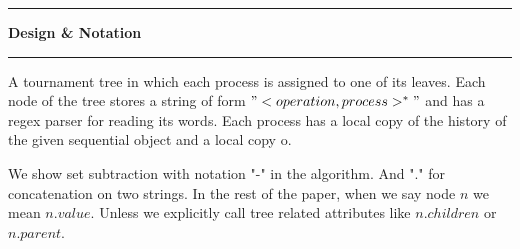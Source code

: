 \documentclass[10pt]{article}
\newcommand\question[1]{\vspace{1.2em}\hrule\textbf{ #1}\vspace{.5em}\hrule}
\theoremstyle{definition}
\begin{document}
%
%
%
%
%
\question{Design \& Notation}
A tournament tree in which each process is assigned to one of its leaves. Each node of the tree stores a string of form $"<operation, process>^*"$ and has a regex parser for reading its words. Each process has a local copy of the history of the given sequential object and a local copy o.

We show set subtraction with notation "-" in the algorithm. And "." for concatenation on two strings. 
In the rest of the paper, when we say node $n$ we mean $n.value$. Unless we explicitly call tree related attributes like $n.children$ or $n.parent$.
\end{document}
